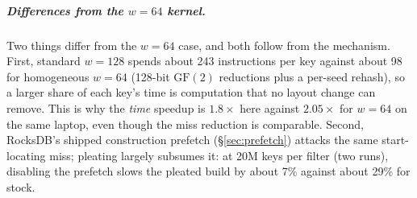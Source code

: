 \documentclass[a4paper,UKenglish,cleveref,autoref,thm-restate,anonymous]{lipics-v2021}
\begin{document}
\subparagraph*{Differences from the $w=64$ kernel.} Two things differ from the $w=64$ case, and both follow from the mechanism. First, standard
$w=128$ spends about 243 instructions per key against about 98 for homogeneous
$w=64$ (128-bit \(\mathrm{GF}(2)\) reductions plus a per-seed rehash), so a larger share of each key's
time is computation that no layout change can remove. This is why the \emph{time} speedup
is $1.8\times$ here against $2.05\times$ for $w=64$ on the same laptop, even though the miss reduction is comparable. Second, RocksDB's shipped construction
prefetch (\S\ref{sec:prefetch}) attacks the same start-locating miss; pleating largely subsumes it: at 20M keys
per filter (two runs), disabling the prefetch slows the pleated build by about 7\% against about 29\% for stock.
\end{document}
